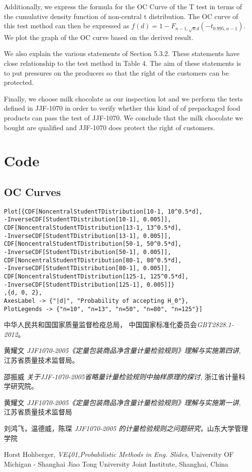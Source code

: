 \documentclass[conf]{new-aiaa}
\begin{document}
Additionally, we express the formula for the OC Curve of the T test in terms of the cumulative density function of non-central t distribution. The OC curve of this test method can then be expressed as $f(d)=1-F_{n-1,\sqrt{n}d}(-t_{0.995,n-1})$. We plot the graph of the OC curve based on the derived result.

We also explain the various statements of Section 5.3.2. These statements have close relationship to the test method in Table 4. The aim of these statements is to put pressures on the producers so that the right of the customers can be protected.

Finally, we choose milk chocolate as our inspection lot and we perform the tests defined in JJF-1070 in order to verify whether this kind of of prepackaged food products can pass the test of JJF-1070. We conclude that the milk chocolate we bought are qualified and JJF-1070 does protect the right of customers.
\newpage

\section{Code}

\subsection{OC Curves}
\begin{verbatim}
Plot[{CDF[NoncentralStudentTDistribution[10-1, 10^0.5*d],
-InverseCDF[StudentTDistribution[10-1], 0.005]],
CDF[NoncentralStudentTDistribution[13-1, 13^0.5*d],
-InverseCDF[StudentTDistribution[13-1], 0.005]],
CDF[NoncentralStudentTDistribution[50-1, 50^0.5*d],
-InverseCDF[StudentTDistribution[50-1], 0.005]],
CDF[NoncentralStudentTDistribution[80-1, 80^0.5*d],
-InverseCDF[StudentTDistribution[80-1], 0.005]],
CDF[NoncentralStudentTDistribution[125-1, 125^0.5*d],
-InverseCDF[StudentTDistribution[125-1], 0.005]]}
,{d, 0, 2},
AxesLabel -> {"|d|", "Probability of accepting H_0"},
PlotLegends -> {"n=10", "n=13", "n=50", "n=80", "n=125"}]
\end{verbatim}

\begin{thebibliography}{9}
中华人民共和国国家质量监督检疫总局， 中国国家标准化委员会\emph{GBT2828.1-2012}。

黄耀文 \emph{JJF1070-2005《定量包装商品净含量计量检验规则》理解与实施第四讲}, 江苏省质量技术监督局。

邵振威 \emph{关于JJF-1070-2005省略量计量检验规则中抽样原理的探讨}, 浙江省计量科学研究院。

黄耀文 \emph{JJF1070-2005《定量包装商品净含量计量检验规则》理解与实施第一讲}, 江苏省质量技术监督局

刘鸿飞，温德威，陈琛 \emph{JJF1070-2005 的计量检验规则之问题研究}，山东大学管理学院

Horst Hohberger, \emph{VE401,Probabilistic Methods in Eng. Slides}, University OF Michigan - Shanghai Jiao Tong University Joint Institute, Shanghai, China

\end{thebibliography}
\end{document}
